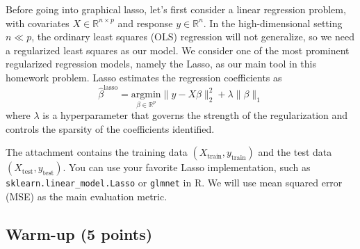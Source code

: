\documentclass{article}
\begin{document}
Before going into graphical lasso, let's first consider a linear regression problem, with covariates $X \in \mathbb{R}^{n\times p}$
and response $y \in \mathbb{R}^n$. In the high-dimensional setting $n \ll p$, the ordinary least squares (OLS) regression will
not generalize, so we need a regularized least squares as our model. We consider one of the most prominent
regularized regression models, namely the Lasso, as our main tool in this homework problem. Lasso estimates
the regression coefficients as
\[\hat{\beta}^{\text{lasso}} = \underset{\beta\in\mathbb{R}^p}{\text{argmin}} \|y - X\beta\|_2^2 + \lambda\|\beta\|_1 \tag{1}\]
where $\lambda$ is a hyperparameter that governs the strength of the regularization and controls the sparsity of the
coefficients identified.

The attachment contains the training data $(X_{\text{train}}, y_{\text{train}})$ and the test data $(X_{\text{test}}, y_{\text{test}})$. You can use
your favorite Lasso implementation, such as \texttt{sklearn.linear\_model.Lasso} or \texttt{glmnet} in R. We will use
mean squared error (MSE) as the main evaluation metric.

\subsection{Warm-up (5 points)}
\end{document}
